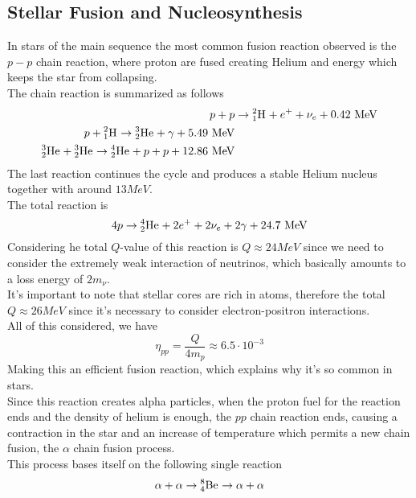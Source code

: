 \documentclass[../qm.tex]{subfiles}
\begin{document}
\subsection{Stellar Fusion and Nucleosynthesis}
In stars of the main sequence the most common fusion reaction observed is the $p-p$ chain reaction, where proton are fused creating Helium and energy which keeps the star from collapsing.\\
The chain reaction is summarized as follows
\begin{equation}
	\begin{aligned}
		p+p&\to\nuc{H}{2}{1}+e^++\nu_e+0.42\unit{MeV}\\
		p+\nuc{H}{2}{1}\to\nuc{He}{3}{2}+\gamma+5.49\unit{MeV}\\
		\nuc{He}{3}{2}+\nuc{He}{3}{2}\to\nuc{He}{4}{2}+p+p+12.86\unit{MeV}
	\end{aligned}
	\label{eq:ppchain}
\end{equation}
The last reaction continues the cycle and produces a stable Helium nucleus together with around $13\unit{MeV}$.\\
The total reaction is
\begin{equation*}
	4p\to\nuc{He}{4}{2}+2e^++2\nu_e+2\gamma+24.7\unit{MeV}
\end{equation*}
Considering he total $Q$-value of this reaction is $Q\approx24\unit{MeV}$ since we need to consider the extremely weak interaction of neutrinos, which basically amounts to a loss energy of $2m_\nu$.\\
It's important to note that stellar cores are rich in atoms, therefore the total $Q\approx26\unit{MeV}$ since it's necessary to consider electron-positron interactions.\\
All of this considered, we have
\begin{equation*}
	\eta_{pp}=\frac{Q}{4m_p}\approx6.5\cdot10^{-3}
\end{equation*}
Making this an efficient fusion reaction, which explains why it's so common in stars.\\
Since this reaction creates alpha particles, when the proton fuel for the reaction ends and the density of helium is enough, the $pp$ chain reaction ends, causing a contraction in the star and an increase of temperature which permits a new chain fusion, the $\alpha$ chain fusion process.\\
This process bases itself on the following single reaction
\begin{equation*}
	\alpha+\alpha\to\nuc{Be}{8}{4}\to\alpha+\alpha
\end{equation*}
\end{document}
